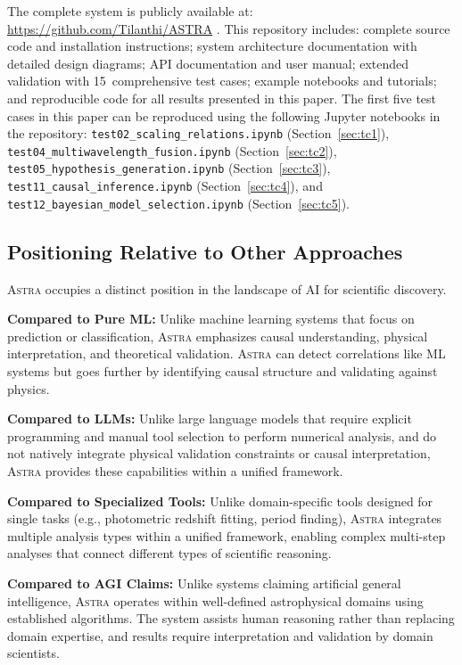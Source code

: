 \documentclass[fleqn,usenatbib]{mnras}
\newcommand{\astra}{\textsc{Astra}\xspace}
\begin{document}
The complete system is publicly available at: \url{https://github.com/Tilanthi/ASTRA} \citep{WhiteDey2026}.
This repository includes: complete source code and installation instructions; system architecture documentation with detailed design diagrams; API documentation and user manual; extended validation with 15~comprehensive test cases; example notebooks and tutorials; and reproducible code for all results presented in this paper.
The first five test cases in this paper can be reproduced using the following Jupyter notebooks in the repository:
\texttt{test02\_scaling\_relations.ipynb} (Section~\ref{sec:tc1}),
\texttt{test04\_multiwavelength\_fusion.ipynb} (Section~\ref{sec:tc2}),
\texttt{test05\_hypothesis\_generation.ipynb} (Section~\ref{sec:tc3}),
\texttt{test11\_causal\_inference.ipynb} (Section~\ref{sec:tc4}), and
\texttt{test12\_bayesian\_model\_selection.ipynb} (Section~\ref{sec:tc5}).

\subsection{Positioning Relative to Other Approaches}
\label{sec:methods:positioning}

\astra occupies a distinct position in the landscape of AI for scientific discovery.

\textbf{Compared to Pure ML:}
Unlike machine learning systems that focus on prediction or classification, \astra emphasizes causal understanding, physical interpretation, and theoretical validation.
\astra can detect correlations like ML systems but goes further by identifying causal structure and validating against physics.

\textbf{Compared to LLMs:}
Unlike large language models that require explicit programming and manual tool selection to perform numerical analysis, and do not natively integrate physical validation constraints or causal interpretation, \astra provides these capabilities within a unified framework.

\textbf{Compared to Specialized Tools:}
Unlike domain-specific tools designed for single tasks (e.g., photometric redshift fitting, period finding), \astra integrates multiple analysis types within a unified framework, enabling complex multi-step analyses that connect different types of scientific reasoning.

\textbf{Compared to AGI Claims:}
Unlike systems claiming artificial general intelligence, \astra operates within well-defined astrophysical domains using established algorithms.
The system assists human reasoning rather than replacing domain expertise, and results require interpretation and validation by domain scientists.
\end{document}
